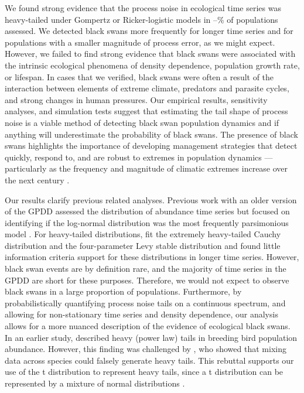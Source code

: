We found strong evidence that the process noise in ecological time series was
heavy-tailed under  Gompertz or Ricker-logistic models in
\overallMinPerc--\overallMaxPerc\% of populations assessed. We detected black
swans more frequently for longer time series and for populations with a smaller
magnitude of process error, as we might expect. However, we failed to find
strong evidence that black swans were associated with the intrinsic ecological
phenomena of density dependence, population growth rate, or lifespan. In cases
that we verified, black swans were often a result of the interaction between
elements of extreme climate, predators and parasite cycles, and strong changes
in human pressures. Our empirical results, sensitivity analyses, and simulation
tests suggest that estimating the tail shape of process noise is a viable
method of detecting black swan population dynamics and if anything will
underestimate the probability of black swans. The presence of black swans
highlights the importance of developing management strategies that detect
quickly, respond to, and are robust to extremes in population dynamics ---
particularly as the frequency and magnitude of climatic extremes increase over
the next century \citep{easterling2000,ipcc2012}.

Our results clarify previous related analyses. Previous work with an older
version of the GPDD assessed the distribution of abundance time series but
focused on identifying if the log-normal distribution was the most frequently
parsimonious model \citep{halley2002}. For heavy-tailed distributions,
\citet{halley2002} fit the extremely heavy-tailed Cauchy distribution and the
four-parameter Levy stable distribution and found little information criteria
support for these distributions in longer time series. However, black swan
events are by definition rare, and the majority of time series in the GPDD are
short for these purposes. Therefore, we would not expect to observe black swans
in a large proportion of populations. Furthermore, by probabilistically
quantifying process noise tails on a continuous spectrum, and allowing for
non-stationary time series and density dependence, our analysis allows for
a more nuanced description of the evidence of ecological black swans. In an
earlier study, \citet{keitt1998} described heavy (power law) tails in breeding
bird population abundance. However, this finding was challenged by
\citet{allen2001}, who showed that mixing data across species could
falsely generate heavy tails. This rebuttal supports our use of the
t distribution to represent heavy tails, since a t distribution can be
represented by a mixture of normal distributions \citep[with the same mean and
inverse-gamma-distributed variances,][]{gelman2014}.

